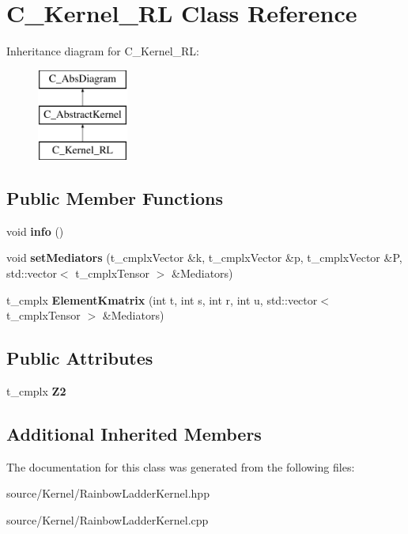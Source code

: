 \hypertarget{class_c___kernel___r_l}{\section{C\-\_\-\-Kernel\-\_\-\-R\-L Class Reference}
\label{class_c___kernel___r_l}
}
Inheritance diagram for C\-\_\-\-Kernel\-\_\-\-R\-L\-:\begin{figure}[H]
\begin{center}
\leavevmode
\includegraphics[height=3.000000cm]{class_c___kernel___r_l}
\end{center}
\end{figure}
\subsection*{Public Member Functions}
\begin{DoxyCompactItemize}
\item 
\hypertarget{class_c___kernel___r_l_a456dc18a4f961f9f3d8d1a51917eee8c}{void {\bfseries info} ()}\label{class_c___kernel___r_l_a456dc18a4f961f9f3d8d1a51917eee8c}

\item 
\hypertarget{class_c___kernel___r_l_abb7217ca0b629a6d28f460f27b0b3306}{void {\bfseries set\-Mediators} (t\-\_\-cmplx\-Vector \&k, t\-\_\-cmplx\-Vector \&p, t\-\_\-cmplx\-Vector \&P, std\-::vector$<$ t\-\_\-cmplx\-Tensor $>$ \&Mediators)}\label{class_c___kernel___r_l_abb7217ca0b629a6d28f460f27b0b3306}

\item 
\hypertarget{class_c___kernel___r_l_a74a876dbb773d242c6264182c7949ca2}{t\-\_\-cmplx {\bfseries Element\-Kmatrix} (int t, int s, int r, int u, std\-::vector$<$ t\-\_\-cmplx\-Tensor $>$ \&Mediators)}\label{class_c___kernel___r_l_a74a876dbb773d242c6264182c7949ca2}

\end{DoxyCompactItemize}
\subsection*{Public Attributes}
\begin{DoxyCompactItemize}
\item 
\hypertarget{class_c___kernel___r_l_aac0de569f84bb52bb886fc8e619311f5}{t\-\_\-cmplx {\bfseries Z2}}\label{class_c___kernel___r_l_aac0de569f84bb52bb886fc8e619311f5}

\end{DoxyCompactItemize}
\subsection*{Additional Inherited Members}


The documentation for this class was generated from the following files\-:\begin{DoxyCompactItemize}
\item 
source/\-Kernel/Rainbow\-Ladder\-Kernel.\-hpp\item 
source/\-Kernel/Rainbow\-Ladder\-Kernel.\-cpp\end{DoxyCompactItemize}
